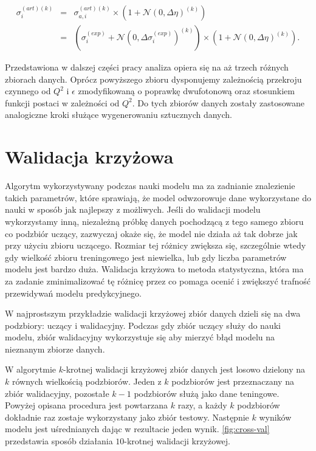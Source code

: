 \documentclass[11pt]{book}
\theoremstyle{definition}
\begin{document}
\begin{eqnarray}
\sigma^{(art)(k)}_{i}  &=& \sigma^{(art)(k)}_{a,i} \times \left( 1  + \mathcal{N}\left( 0, \Delta \eta \right)^{(k)} \right) \nonumber\\
&=& \left(\sigma_i^{(exp)} + \mathcal{N}\left( 0, \Delta \sigma_i^{(exp)} \right)^{(k)}\right) \times \left( 1  + \mathcal{N}\left( 0, \Delta \eta \right)^{(k)} \right).
\end{eqnarray}

Przedstawiona w dalszej części pracy analiza opiera się na aż trzech różnych zbiorach danych. Oprócz powyższego zbioru dysponujemy zależnością przekroju czynnego od $Q^2$ i $\epsilon$ zmodyfikowaną o poprawkę dwufotonową oraz stosunkiem funkcji postaci w zależności od $Q^2$. Do tych zbiorów danych zostały zastosowane analogiczne kroki służące wygenerowaniu sztucznych danych.


\section{Walidacja krzyżowa}

Algorytm wykorzystywany podczas nauki modelu ma za zadnianie znalezienie takich parametrów, które sprawiają, że model odwzorowuje dane wykorzystane do nauki w sposób jak najlepszy z możliwych. Jeśli do walidacji modelu wykorzystamy inną, niezależną próbkę danych pochodzącą z tego samego zbioru co podzbiór uczący, zazwyczaj okaże się, że model nie działa aż tak dobrze jak przy użyciu zbioru uczącego. Rozmiar tej różnicy zwiększa się, szczególnie wtedy gdy wielkość zbioru treningowego jest niewielka, lub gdy liczba parametrów modelu jest bardzo duża.
Walidacja krzyżowa to metoda statystyczna, która ma za zadanie zminimalizować tę różnicę przez co pomaga ocenić i zwiększyć trafność przewidywań modelu predykcyjnego. 


W najprostszym przykładzie walidacji krzyżowej zbiór danych dzieli się na dwa podzbiory: uczący i walidacyjny. Podczas gdy zbiór uczący służy do nauki modelu, zbiór walidacyjny wykorzystuje się aby mierzyć błąd modelu na nieznanym zbiorze danych. 

W algorytmie $k$-krotnej walidacji krzyżowej zbiór danych jest losowo dzielony na $k$ równych wielkością podzbiorów. Jeden z $k$ podzbiorów jest przeznaczany na zbiór walidacyjny, pozostałe $k-1$ podzbiorów służą jako dane teningowe. Powyżej opisana procedura jest powtarzana $k$ razy, a każdy $k$ podzbiorów dokładnie raz zostaje wykorzystany jako zbiór testowy. Następnie $k$ wyników modelu jest uśrednianych dając w rezultacie jeden wynik. \figurename{} \ref{fig:cross-val} przedstawia sposób działania $10$-krotnej walidacji krzyżowej.
\end{document}
